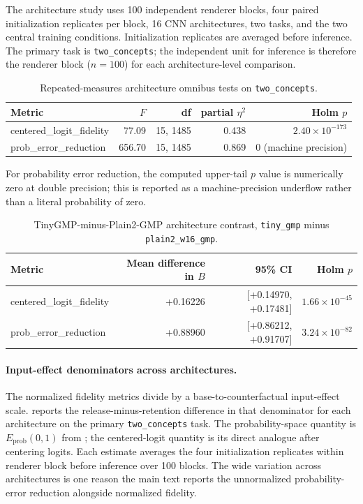 The architecture study uses 100 independent renderer blocks, four paired initialization replicates per block, 16 CNN architectures, two tasks, and the two central training conditions. Initialization replicates are averaged before inference. The primary task is \texttt{two\_concepts}; the independent unit for inference is therefore the renderer block ($n=100$) for each architecture-level comparison.

\begin{table}[h]
\caption{Repeated-measures architecture omnibus tests on \texttt{two\_concepts}.}
\label{tab:app-architecture-omnibus}
\centering
\small
\begin{tabular}{lrrrr}
\toprule
Metric & $F$ & df & partial $\eta^2$ & Holm $p$ \\
\midrule
centered\_logit\_fidelity & 77.09 & 15, 1485 & 0.438 & $2.40\times10^{-173}$ \\
prob\_error\_reduction & 656.70 & 15, 1485 & 0.869 & 0 (machine precision) \\
\bottomrule
\end{tabular}
\end{table}

For probability error reduction, the computed upper-tail $p$ value is numerically zero at double precision; this is reported as a machine-precision underflow rather than a literal probability of zero.

\begin{table}[h]
\caption{TinyGMP-minus-Plain2-GMP architecture contrast, \texttt{tiny\_gmp} minus \texttt{plain2\_w16\_gmp}.}
\label{tab:app-architecture-bridge}
\centering
\small
\begin{tabular}{lrrr}
\toprule
Metric & Mean difference in $B$ & 95\% CI & Holm $p$ \\
\midrule
centered\_logit\_fidelity & +0.16226 & [+0.14970, +0.17481] & $1.66\times10^{-45}$ \\
prob\_error\_reduction & +0.88960 & [+0.86212, +0.91707] & $3.24\times10^{-82}$ \\
\bottomrule
\end{tabular}
\end{table}

\paragraph{Input-effect denominators across architectures.}
The normalized fidelity metrics divide by a base-to-counterfactual input-effect scale.  reports the release-minus-retention difference in that denominator for each architecture on the primary \texttt{two\_concepts} task. The probability-space quantity is $E_{\mathrm{prob}}(0,1)$ from ; the centered-logit quantity is its direct analogue after centering logits. Each estimate averages the four initialization replicates within renderer block before inference over 100 blocks. The wide variation across architectures is one reason the main text reports the unnormalized probability-error reduction alongside normalized fidelity.

